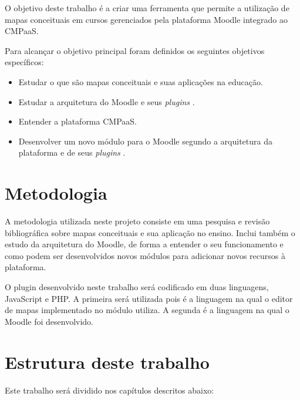 \documentclass[
	12pt,				%
	openright,			%
	oneside,			%
	a4paper,			%
	english,			%
	french,				%
	spanish,			%
	brazil				%
	]{abntex2}
\begin{document}
O objetivo deste trabalho é a criar uma ferramenta que permite a utilização de mapas conceituais em cursos gerenciados pela plataforma Moodle integrado ao CMPaaS.

Para alcançar o objetivo principal foram definidos os seguintes objetivos específicos:

\begin{itemize}
	\item Estudar o que são mapas conceituais e suas aplicações na educação.
	\item Estudar a arquitetura do Moodle e seus \textit{plugins} .
	\item Entender a plataforma CMPaaS.
	\item Desenvolver um novo módulo para o Moodle segundo a arquitetura da plataforma e de seus \textit{plugins} .   
\end{itemize} 



\section{Metodologia}

A metodologia utilizada neste projeto consiste em uma pesquisa e revisão bibliográfica sobre mapas conceituais e sua aplicação no ensino. Inclui também o estudo da arquitetura do Moodle, de forma a entender o seu funcionamento e como podem ser desenvolvidos novos módulos para adicionar novos recursos à plataforma.

O plugin desenvolvido neste trabalho será codificado em duas linguagens, JavaScript e PHP. A primeira será utilizada pois é a linguagem na qual o editor de mapas implementado no módulo utiliza. A segunda é a linguagem na qual o Moodle foi desenvolvido.  

\section{Estrutura deste trabalho}

Este trabalho será dividido nos capítulos descritos abaixo:
\end{document}
